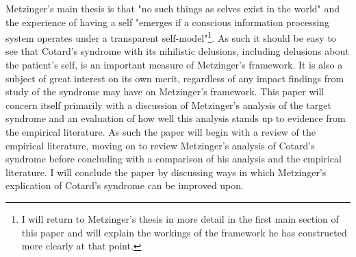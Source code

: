Metzinger's main thesis is that "no such things as selves exist in the world" \cite[p. 1]{metzinger2003} and the experience of having a self "emerges if a conscious information processing system operates under a transparent self-model"\footnote{I will return to Metzinger’s thesis in more detail in the first main section of this paper and will explain the workings of the framework he has constructed more clearly at that point.}. As such it should be easy to see that Cotard's syndrome with its nihilistic delusions, including delusions about the patient's self, is an important measure of Metzinger's framework. It is also a subject of great interest on its own merit, regardless of any impact findings from study of the syndrome may have on Metzinger's framework.
This paper will concern itself primarily with a discussion of Metzinger's analysis of the target syndrome and an evaluation of how well this analysis stands up to evidence from the empirical literature. As such the paper will begin with a review of the empirical literature, moving on to review Metzinger's analysis of Cotard's syndrome before concluding with a comparison of his analysis and the empirical literature. I will conclude the paper by discussing ways in which Metzinger's explication of Cotard's syndrome can be improved upon.

